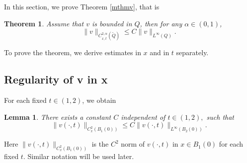 \documentclass[12pt]{article}
\newtheorem{theorem}{Theorem}[section]
\newtheorem{lemma}[definition]{Lemma}
\theoremstyle{remark}
\numberwithin{equation}{section}
\begin{document}
In this section, we prove Theorem \ref{mthmv}, that is

\begin{theorem} \label{thm2.1} Assume that $v$ is bounded in $Q$, then for any $\alpha \in (0,1)$,
$$
\|v\|_{C^{2, \alpha}_{x, t} (\tilde{Q})} \leq C \|v\|_{L^\infty (Q)}.
$$

\end{theorem}

To prove the theorem, we derive estimates in $x$ and in $t$ separately.

\subsection{Regularity of v in x}

For each fixed $t \in (1,2)$, we obtain

\begin{lemma} \label{thm2.1.1}
There exists a constant $C$ independent of $t\in(1,2),$ such that
$$
\|v(\cdot,t)\|_{C^{2}_{x} (B_1(0))} \leq C \|v(\cdot,t)\|_{L^\infty (B_2(0))}.
$$
\end{lemma}

Here $\|v(\cdot,t)\|_{C^{2}_{x} (B_1(0))}$ is the $C^2$ norm of $v(\cdot, t)$ in $x \in B_1(0)$ for each fixed $t$. Similar notation will be used later.
\end{document}
